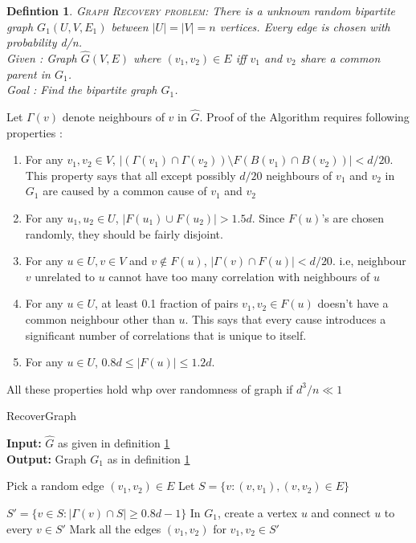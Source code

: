 \documentclass[11pt]{article}
\newtheorem{defn}{Defintion}
\begin{document}
	\begin{defn}
		\label{def:graphreco}
		\textsc{Graph Recovery problem:} There is a unknown random bipartite graph $G_1(U,V,E_1)$ between $|U| = |V| = n$ vertices. Every edge is chosen with probability d/n.\\
		\textnormal{Given :} Graph $\hat{G}(V,E)$ where $(v_1,v_2) \in E$ iff $v_1$ and $v_2$ share a common parent in $G_1$.\\
		\textnormal{Goal :} Find the bipartite graph $G_1$.
	\end{defn}
	Let $\Gamma(v)$ denote neighbours of $v$ in $\hat{G}$. Proof of the Algorithm requires following properties :
	\begin{enumerate}

		\item For any $v_1,v_2 \in V$, $|(\Gamma(v_1)\cap \Gamma(v_2)) \setminus F(B(v_1)\cap B(v_2))| < d/20$. This property says that all except possibly $d/20$ neighbours of $v_1$ and $v_2$ in $G_1$ are caused by a common cause of $v_1$ and $v_2$

		\item For any $u_1,u_2 \in U$, $|F(u_1)\cup F(u_2)| > 1.5d$. Since $F(u)$'s are chosen randomly, they should be fairly disjoint.

		\item  For any $u \in U, v \in V $ and $v\notin F(u)$, $|\Gamma(v)\cap F(u)|<d/20$. i.e, neighbour $v$ unrelated to $u$ cannot have too many correlation with neighbours of $u$

		\item For any $u \in U$, at least 0.1 fraction of pairs $v_1, v_2 \in F(u)$ doesn't have a common neighbour other than $u$. This says that every cause introduces a significant number of correlations that is unique to itself.

		\item For any $u \in U$, $0.8d \leq |F(u)| \leq 1.2d$.

	\end{enumerate}
	All these properties hold whp over randomness of graph if $d^3/n \ll 1$

	\begin{algorithm}
		\caption{RecoverGraph}
		\label{algo:graphreco}
		\textbf{Input:}  $\hat{G}$ as given in definition \ref{def:graphreco}\\
		\textbf{Output:} Graph $G_1$ as in definition \ref{def:graphreco}
		\begin{algorithmic}[1]
			\REPEAT
			\STATE Pick a random edge $(v_1,v_2) \in E$
			\STATE Let $S = \{v: (v,v_1),(v,v_2) \in E \}$

			\STATE $S' = \{ v \in S: |\Gamma(v)\cap S|\geq 0.8d-1\}$
			\STATE In $G_1$, create a vertex $u$ and connect $u$ to every $v \in S'$
			\STATE Mark all the edges $(v_1,v_2)$ for $v_1,v_2\in S'$
			\ENDIF
		\end{algorithmic}
	\end{algorithm}
\end{document}
